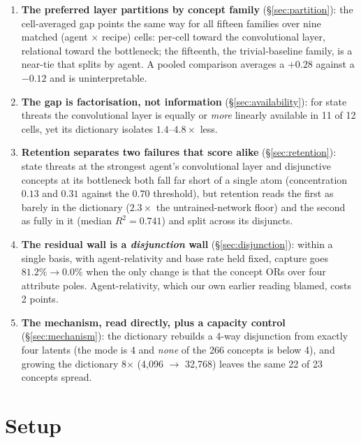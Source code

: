 \documentclass{article}
\begin{document}
\begin{enumerate}
  \item \textbf{The preferred layer partitions by concept family}
        (\S\ref{sec:partition}): the cell-averaged gap points the same way for all
        fifteen families over nine matched (agent $\times$ recipe) cells: per-cell
        toward the convolutional layer, relational toward the bottleneck; the
        fifteenth, the trivial-baseline family, is a near-tie that splits by agent.
        A pooled comparison averages a $+0.28$ against a $-0.12$ and is
        uninterpretable.
  \item \textbf{The gap is factorisation, not information}
        (\S\ref{sec:availability}): for state threats the convolutional layer is
        equally or \emph{more} linearly available in 11 of 12 cells, yet its
        dictionary isolates $1.4$--$4.8\times$ less.
  \item \textbf{Retention separates two failures that score alike}
        (\S\ref{sec:retention}): state threats at the strongest agent's convolutional
        layer and disjunctive concepts at its bottleneck both fall far short of a
        single atom (concentration $0.13$ and $0.31$ against the $0.70$ threshold),
        but retention reads the first as barely in the dictionary ($2.3\times$ the
        untrained-network floor) and the second as fully in it (median $R^2 = 0.741$)
        and split across its disjuncts.
  \item \textbf{The residual wall is a \emph{disjunction} wall}
        (\S\ref{sec:disjunction}): within a single basis, with agent-relativity and
        base rate held fixed, capture goes $81.2\% \to 0.0\%$ when the only change is
        that the concept ORs over four attribute poles. Agent-relativity, which our
        own earlier reading blamed, costs 2 points.
  \item \textbf{The mechanism, read directly, plus a capacity control}
        (\S\ref{sec:mechanism}): the dictionary rebuilds a 4-way disjunction from
        exactly four latents (the mode is 4 and \emph{none} of the 266 concepts is
        below 4), and growing the dictionary 8$\times$ (4{,}096 $\to$ 32{,}768) leaves
        the same 22 of 23 concepts spread.
\end{enumerate}

\section{Setup}
\label{sec:setup}
\end{document}
